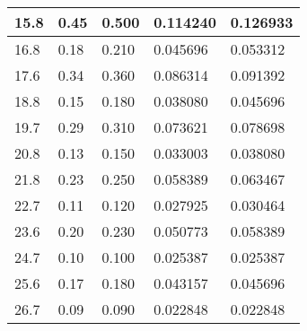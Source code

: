 \begin{longtable}{|p{3cm}|p{3cm}|p{3cm}|p{3cm}|p{3cm}|}
    15.8     & 0.45                  & 0.500                 & 0.114240                                                 & 0.126933                                                 \\\hline
    16.8     & 0.18                  & 0.210                 & 0.045696                                                 & 0.053312                                                 \\\hline
    17.6     & 0.34                  & 0.360                 & 0.086314                                                 & 0.091392                                                 \\\hline
    18.8     & 0.15                  & 0.180                 & 0.038080                                                 & 0.045696                                                 \\\hline
    19.7     & 0.29                  & 0.310                 & 0.073621                                                 & 0.078698                                                 \\\hline
    20.8     & 0.13                  & 0.150                 & 0.033003                                                 & 0.038080                                                 \\\hline
    21.8     & 0.23                  & 0.250                 & 0.058389                                                 & 0.063467                                                 \\\hline
    22.7     & 0.11                  & 0.120                 & 0.027925                                                 & 0.030464                                                 \\\hline
    23.6     & 0.20                  & 0.230                 & 0.050773                                                 & 0.058389                                                 \\\hline
    24.7     & 0.10                  & 0.100                 & 0.025387                                                 & 0.025387                                                 \\\hline
    25.6     & 0.17                  & 0.180                 & 0.043157                                                 & 0.045696                                                 \\\hline
    26.7     & 0.09                  & 0.090                 & 0.022848                                                 & 0.022848                                                 \\\hline

\end{longtable}
